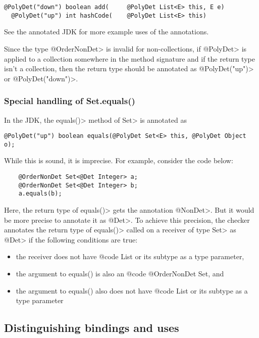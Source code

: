 \begin{Verbatim}
@PolyDet("down") boolean add(     @PolyDet List<E> this, E e)
  @PolyDet("up") int hashCode(    @PolyDet List<E> this)
\end{Verbatim}

See the annotated JDK for more example uses of the annotations.

Since the type \<@OrderNonDet> is invalid for non-collections,
if \<@PolyDet> is applied to a collection somewhere in the method signature
and if the return type isn't a collection, then the return type should be
annotated as \<@PolyDet("up")> or \<@PolyDet("down")>.

\subsubsection{Special handling of Set.equals()\label{determinism-improved-precision-set-equals}}

In the JDK, the \<equals()> method of \<Set> is annotated as
\begin{Verbatim}
@PolyDet("up") boolean equals(@PolyDet Set<E> this, @PolyDet Object o);
\end{Verbatim}
While this is sound, it is imprecise.
For example, consider the code below:

\begin{Verbatim}
    @OrderNonDet Set<@Det Integer> a;
    @OrderNonDet Set<@Det Integer> b;
    a.equals(b);
\end{Verbatim}

Here, the return type of \<equals()> gets the annotation \<@NonDet>.
But it would be more precise to annotate it as \<@Det>.
To achieve this precision, the checker annotates the return type
of \<equals()> called on a receiver of type \<Set> as \<@Det> if the
following conditions are true:
\begin{itemize}
    \item the receiver does not have {@code List} or its subtype as a type parameter,
    \item the argument to equals() is also an {@code @OrderNonDet Set}, and
    \item the argument to equals() also does not have {@code List} or its subtype as a
    type parameter
\end{itemize}

\subsection{Distinguishing bindings and uses\label{determinism-polymorphism-binding}}

